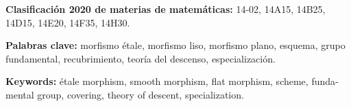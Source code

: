 \medskip
\noindent\textbf{Clasificación 2020 de materias de matemáticas:} 14-02, 14A15, 14B25, 14D15, 14E20, 14F35, 14H30.

\medskip
\noindent\textbf{Palabras clave:} morfismo étale, morfismo liso, morfismo plano, esquema, grupo fundamental, recubrimiento, teoría del descenso, especialización.

\begin{otherlanguage}{english}
\medskip
\noindent\textbf{Keywords:} étale morphism, smooth morphism, flat morphism, scheme, fundamental group, covering, theory of descent, specialization.
\end{otherlanguage}

\cleardoublepage
